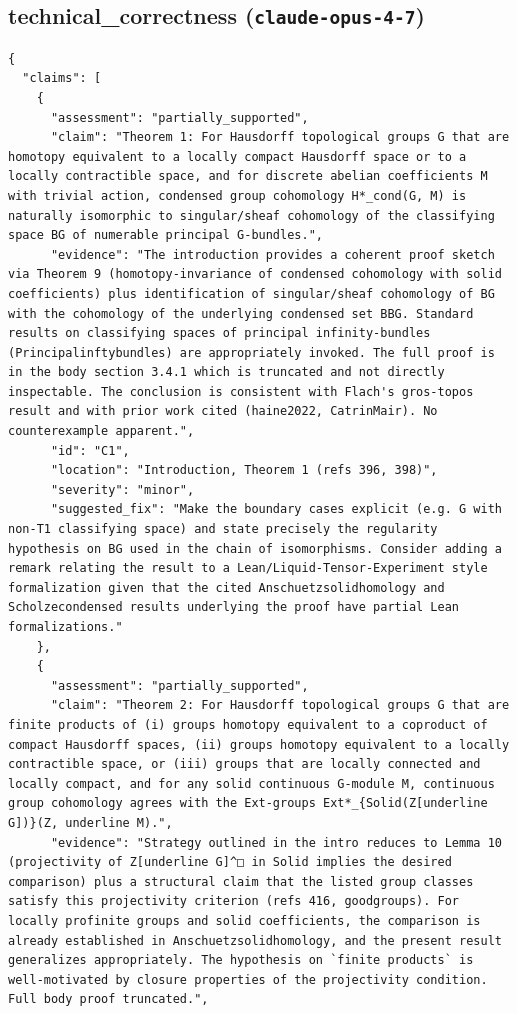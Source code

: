 \documentclass[11pt]{article}
\begin{document}
\subsection*{technical_correctness (\texttt{claude-opus-4-7})}
\begin{verbatim}
{
  "claims": [
    {
      "assessment": "partially_supported",
      "claim": "Theorem 1: For Hausdorff topological groups G that are homotopy equivalent to a locally compact Hausdorff space or to a locally contractible space, and for discrete abelian coefficients M with trivial action, condensed group cohomology H*_cond(G, M) is naturally isomorphic to singular/sheaf cohomology of the classifying space BG of numerable principal G-bundles.",
      "evidence": "The introduction provides a coherent proof sketch via Theorem 9 (homotopy-invariance of condensed cohomology with solid coefficients) plus identification of singular/sheaf cohomology of BG with the cohomology of the underlying condensed set BBG. Standard results on classifying spaces of principal infinity-bundles (Principalinftybundles) are appropriately invoked. The full proof is in the body section 3.4.1 which is truncated and not directly inspectable. The conclusion is consistent with Flach's gros-topos result and with prior work cited (haine2022, CatrinMair). No counterexample apparent.",
      "id": "C1",
      "location": "Introduction, Theorem 1 (refs 396, 398)",
      "severity": "minor",
      "suggested_fix": "Make the boundary cases explicit (e.g. G with non-T1 classifying space) and state precisely the regularity hypothesis on BG used in the chain of isomorphisms. Consider adding a remark relating the result to a Lean/Liquid-Tensor-Experiment style formalization given that the cited Anschuetzsolidhomology and Scholzecondensed results underlying the proof have partial Lean formalizations."
    },
    {
      "assessment": "partially_supported",
      "claim": "Theorem 2: For Hausdorff topological groups G that are finite products of (i) groups homotopy equivalent to a coproduct of compact Hausdorff spaces, (ii) groups homotopy equivalent to a locally contractible space, or (iii) groups that are locally connected and locally compact, and for any solid continuous G-module M, continuous group cohomology agrees with the Ext-groups Ext*_{Solid(Z[underline G])}(Z, underline M).",
      "evidence": "Strategy outlined in the intro reduces to Lemma 10 (projectivity of Z[underline G]^□ in Solid implies the desired comparison) plus a structural claim that the listed group classes satisfy this projectivity criterion (refs 416, goodgroups). For locally profinite groups and solid coefficients, the comparison is already established in Anschuetzsolidhomology, and the present result generalizes appropriately. The hypothesis on `finite products` is well-motivated by closure properties of the projectivity condition. Full body proof truncated.",

\end{verbatim}
\end{document}
